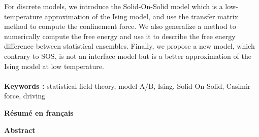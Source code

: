 For discrete models, we introduce the Solid-On-Solid model which is a low-temperature approximation of the Ising model, and use the transfer matrix method to compute the confinement force. We also generalize a method to numerically compute the free energy and use it to describe the free energy difference between statistical ensembles. Finally, we propose a new model, which contrary to SOS, is not an interface model but is a better approximation of the Ising model at low temperature.
\\ \\
{\bf Keywords : }  statistical field theory, model A/B, Ising, Solid-On-Solid, Casimir force, driving

\cleardoublepage
{\bf \huge Résumé en français}
\cleardoublepage



{\bf \huge Abstract}
